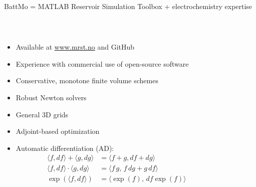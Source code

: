 \documentclass{beamer}
\newcommand{\ad}[1]{\langle #1 \rangle}
\newcommand{\fracpar}[2]{\frac{\partial #1}{\partial #2}}
\newcommand{\grad}{\nabla}
\newcommand{\dive}{\grad\cdot }
\newcommand{\cli}{c_{\text{Li}^+}}
\newcommand{\tli}{t_{\text{Li}^+}}
\newcommand{\zli}{z_{\text{Li}^+}}
\newcommand{\phili}{\phi_{\text{Li}^+}}
\newcommand{\vecNli}{\vec{N}_{\text{Li}^+}}
\begin{document}



\begin{frame}{BattMo = MATLAB Reservoir Simulation Toolbox + electrochemistry expertise}
  \footnotesize

  \begin{columns}
    \begin{column}{0.6\linewidth}
      \centering

      \ \\

      \begin{itemize}
      \item Available at \url{www.mrst.no} and GitHub
      \item Experience with commercial use of open-source software
      \item Conservative, monotone finite volume schemes
      \item Robust Newton solvers
      \item General 3D grids
      \item Adjoint-based optimization
      \item Automatic differentiation (AD):
      \begin{align*}
        \ad{f, df} + \ad{g, dg} &= \ad{f+g, df+dg} \\
        \ad{f, df} \cdot \ad{g, dg} &= \ad{f\,g,\, f\, dg + g\, df} \\
        \exp({\ad{f,df}}) &= \ad{\exp({f}), \, df \exp({f})}
      \end{align*}
      \end{itemize}
    \end{column}
    \begin{column}{0.4\linewidth}
      \centering


\end{column}
\end{columns}
\end{frame}
\end{document}
